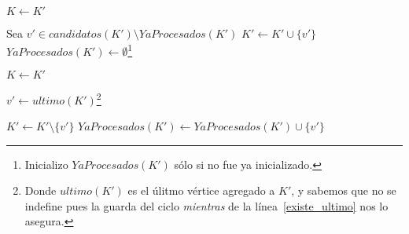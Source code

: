 \begin{minipage}{\textwidth}
\begin{algorithm}[H]
\begin{algorithmic}[1]
                        \State $K \gets K'$

                    \label{existe_ultimo}
                            \State Sea $v' \in candidatos(K') \setminus YaProcesados(K')$
                            \State $K' \gets K' \cup \{v'\}$
                                \State $YaProcesados(K') \gets \emptyset$\footnote{Inicializo
                                    $YaProcesados(K')$ s\'olo si no fue ya inicializado.}

                                \State $K \gets K'$

                        \Else {}
                            \State $v' \gets ultimo(K')$\footnote{Donde $ultimo(K')$
                                es el \'ulitmo v\'ertice agregado a $K'$, y sabemos que no se
                                indefine pues la guarda del ciclo \emph{mientras} de la
                                l\'inea~\ref{existe_ultimo} nos lo asegura.}

                            \State $K' \gets K' \setminus \{v'\}$
                            \State $YaProcesados(K') \gets YaProcesados(K') \cup \{v'\}$

                        \EndIf

                    \EndWhile

                \EndFor
            \EndIf

            \State {}
        \end{algorithmic}
    \end{algorithm}
\end{minipage}
